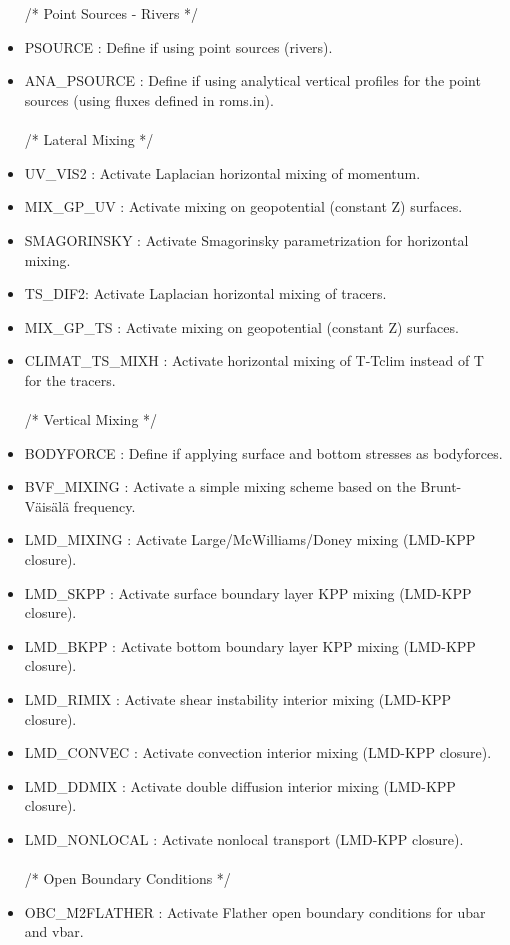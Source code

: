 \begin{itemize}
\\ \\ /*                       Point Sources - Rivers */
\item PSOURCE : Define if using point sources (rivers).
\item ANA\_PSOURCE : Define if using analytical vertical profiles for the point sources
(using fluxes defined in roms.in).
\\ \\ /*                       Lateral Mixing */
\item UV\_VIS2 : Activate Laplacian horizontal mixing of momentum.
\item MIX\_GP\_UV : Activate mixing on geopotential (constant Z) surfaces.
\item SMAGORINSKY : Activate Smagorinsky parametrization for horizontal mixing.
\item TS\_DIF2: Activate Laplacian horizontal mixing of tracers.
\item MIX\_GP\_TS : Activate mixing on geopotential (constant Z) surfaces.
\item CLIMAT\_TS\_MIXH : Activate horizontal mixing of T-Tclim instead of T for the tracers.
\\ \\ /*                       Vertical Mixing */
\item BODYFORCE : Define if applying surface and bottom stresses as bodyforces.
\item BVF\_MIXING : Activate a simple mixing scheme based on the Brunt-V\"ais\"al\"a frequency.
\item LMD\_MIXING : Activate Large/McWilliams/Doney mixing (LMD-KPP closure).
\item LMD\_SKPP : Activate surface boundary layer KPP mixing (LMD-KPP closure). 
\item LMD\_BKPP : Activate bottom boundary layer KPP mixing (LMD-KPP closure). 
\item LMD\_RIMIX : Activate shear instability interior mixing (LMD-KPP closure).
\item LMD\_CONVEC : Activate convection interior mixing (LMD-KPP closure).
\item LMD\_DDMIX : Activate double diffusion interior mixing (LMD-KPP closure). 
\item LMD\_NONLOCAL : Activate nonlocal transport (LMD-KPP closure). 
\\ \\ /*                       Open Boundary Conditions */
\item OBC\_M2FLATHER :  Activate Flather open boundary conditions for ubar and vbar.

\end{itemize}
